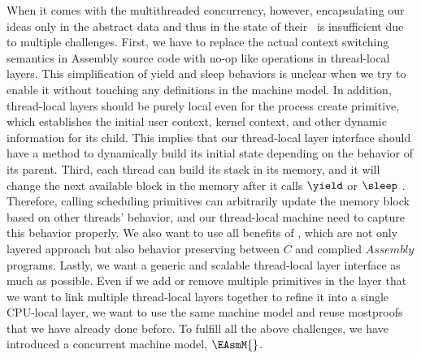 When it comes with the multithreaded concurrency, however, 
encapsulating our ideas only in the abstract data 
and thus in the state of their \compcertx\ is insufficient
due to multiple challenges. 
First, we have to replace the actual context switching semantics in Assembly source code with no-op 
like operations in thread-local layers. 
This simplification of yield and sleep behaviors is unclear when we try to enable it 
without touching any definitions in the machine model. 
In addition, thread-local layers should be purely local even for the process create primitive, 
which establishes the initial user context, kernel context, and other dynamic information for its child. 
This implies that our thread-local layer interface should have a method to dynamically 
build its initial state depending on the behavior of its parent. 
Third, each thread can build its stack in its memory, and it will change the next available block in the memory
after it calls  $\yield$  or  $\sleep$ .
Therefore, calling  scheduling primitives can arbitrarily update 
the memory block based on other threads' behavior, and our thread-local machine need to capture this behavior properly. 
We also want to use all benefits of \compcertx, which are not only layered approach 
but also behavior preserving between $C$ and complied $Assembly$ programs.
Lastly, we want a generic and scalable thread-local layer interface as much as possible.
Even if we add or remove multiple primitives in the layer that we want to link multiple 
thread-local layers together to refine it into a single CPU-local layer, 
we want to use the same machine model and reuse mostproofs that we have already done before. 
To fulfill all the above challenges, we have introduced a concurrent machine model, $\EAsmM{}$.
